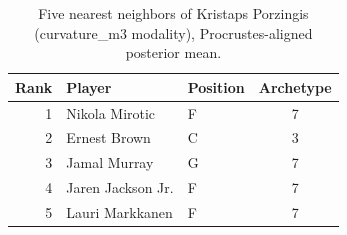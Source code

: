 \begin{table}[htbp]
  \centering\small
  \begin{tabular}{rllc}
    \toprule
    Rank & Player & Position & Archetype \\
    \midrule
    1 & Nikola Mirotic & F & 7 \\
    2 & Ernest Brown & C & 3 \\
    3 & Jamal Murray & G & 7 \\
    4 & Jaren Jackson Jr. & F & 7 \\
    5 & Lauri Markkanen & F & 7 \\
    \bottomrule
  \end{tabular}
  \caption{Five nearest neighbors of Kristaps Porzingis (curvature_m3 modality), Procrustes-aligned posterior mean.}
  \label{tab:Kristaps_Porzingis_neighbors_curvature_m3}
\end{table}

